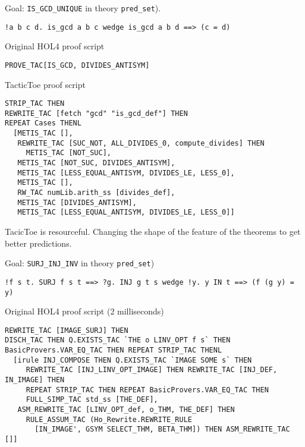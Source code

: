 \documentclass[runningheads,a4paper,draft]{svjour3}
\def\holfour{\textsf{HOL4}\xspace}
\def\tactictoe{\textsf{TacticToe}\xspace}
\begin{document}
Goal: \texttt{IS\_GCD\_UNIQUE} in theory \texttt{pred\_set}).
\begin{lstlisting}[language=SMLSmall,frame=tb]
!a b c d. is_gcd a b c wedge is_gcd a b d ==> (c = d)
\end{lstlisting}

Original \holfour proof script
\begin{lstlisting}[language=SMLSmall,frame=tb]
PROVE_TAC[IS_GCD, DIVIDES_ANTISYM]
\end{lstlisting}

\vspace{5mm}

\tactictoe proof script
\begin{lstlisting}[language=SMLSmall,frame=tb]
STRIP_TAC THEN 
REWRITE_TAC [fetch "gcd" "is_gcd_def"] THEN 
REPEAT Cases THENL 
  [METIS_TAC [], 
   REWRITE_TAC [SUC_NOT, ALL_DIVIDES_0, compute_divides] THEN 
     METIS_TAC [NOT_SUC], 
   METIS_TAC [NOT_SUC, DIVIDES_ANTISYM], 
   METIS_TAC [LESS_EQUAL_ANTISYM, DIVIDES_LE, LESS_0], 
   METIS_TAC [], 
   RW_TAC numLib.arith_ss [divides_def], 
   METIS_TAC [DIVIDES_ANTISYM],
   METIS_TAC [LESS_EQUAL_ANTISYM, DIVIDES_LE, LESS_0]]
\end{lstlisting}

TacicToe is resourceful. Changing the shape of the feature of the theorems
to get better predictions.

Goal: \texttt{SURJ\_INJ\_INV} in theory \texttt{pred\_set})
\begin{lstlisting}[language=SMLSmall,frame=tb]
!f s t. SURJ f s t ==> ?g. INJ g t s wedge !y. y IN t ==> (f (g y) = y)
\end{lstlisting}

Original \holfour proof script (2 milliseconds)
\begin{lstlisting}[language=SMLSmall,frame=tb]
REWRITE_TAC [IMAGE_SURJ] THEN
DISCH_TAC THEN Q.EXISTS_TAC `THE o LINV_OPT f s` THEN
BasicProvers.VAR_EQ_TAC THEN REPEAT STRIP_TAC THENL 
  [irule INJ_COMPOSE THEN Q.EXISTS_TAC `IMAGE SOME s` THEN
     REWRITE_TAC [INJ_LINV_OPT_IMAGE] THEN REWRITE_TAC [INJ_DEF, IN_IMAGE] THEN
     REPEAT STRIP_TAC THEN REPEAT BasicProvers.VAR_EQ_TAC THEN
     FULL_SIMP_TAC std_ss [THE_DEF],
   ASM_REWRITE_TAC [LINV_OPT_def, o_THM, THE_DEF] THEN
     RULE_ASSUM_TAC (Ho_Rewrite.REWRITE_RULE
       [IN_IMAGE', GSYM SELECT_THM, BETA_THM]) THEN ASM_REWRITE_TAC []]
\end{lstlisting}

\vspace{5mm}
\end{document}
